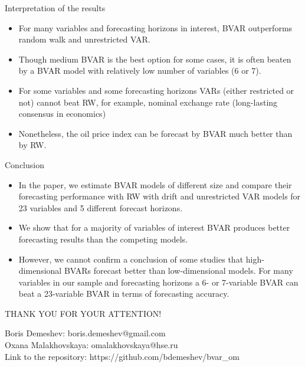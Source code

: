 \documentclass{beamer} %
\begin{document}
\begin{frame}{Interpretation of the results} %
\begin{itemize}
\item For many variables and forecasting horizons in interest, BVAR outperforms random walk and unrestricted VAR.
\item Though medium BVAR is the best option for some cases, it is often beaten by a BVAR model with relatively low number of variables (6 or 7). 
\item For some variables and some forecasting horizons VARs (either restricted or not) cannot beat RW, for example, nominal exchange rate (long-lasting consensus in economics)
\item Nonetheless, the oil price index can be forecast by BVAR much better than by RW.
\end{itemize}
\end{frame}

\begin{frame}{Conclusion}%
\begin{itemize}
\item In the paper, we estimate BVAR models of different size and compare their forecasting performance with RW with drift and unrestricted VAR models for 23 variables and 5 different forecast horizons. 
\item We show that for a majority of variables of interest BVAR produces better forecasting results than the competing models. 
\item However, we cannot confirm a conclusion of some studies that high-dimensional BVARs forecast better than low-dimensional models. For many variables in our sample and forecasting horizons a 6- or 7-variable BVAR can beat a 23-variable BVAR in terms of forecasting accuracy.
\end{itemize}
\end{frame}

\begin{frame}%
\begin{center}
THANK YOU FOR YOUR ATTENTION!
\vspace{1cm}
\end{center}
Boris Demeshev: boris.demeshev@gmail.com\\
Oxana Malakhovskaya: omalakhovskaya@hse.ru\\
Link to the repository: https://github.com/bdemeshev/bvar\_om
\end{frame}
\end{document}
